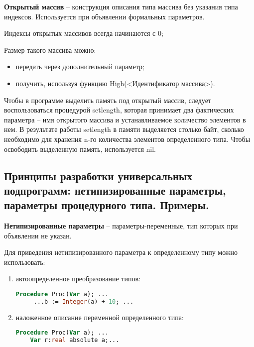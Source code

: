 {\bf Открытый массив} – конструкция описания типа массива без указания типа индексов. Используется при объявлении формальных параметров.

Индексы открытых массивов всегда начинаются с 0;

Размер такого массива можно:
\begin{itemize}
\item передать через дополнительный параметр;
\item получить, используя функцию High(<Идентификатор массива>).
\end{itemize}

Чтобы в программе выделить память под открытый массив, следует воспользоваться процедурой setlength, которая принимает два фактических параметра – имя открытого массива и устанавливаемое количество элементов в нем. В результате работы setlength в памяти выделяется столько байт, сколько необходимо для хранения n-го количества элементов определенного типа. Чтобы освободить выделенную память, используется nil.







\newpage\subsection{Принципы разработки универсальных подпрограмм:  нетипизированные параметры, параметры процедурного типа. Примеры. }


\begin{myquote}
            
\end{myquote}

{\bf Нетипизированные параметры} – параметры-переменные, тип которых при объявлении не указан.

Для приведения нетипизированного параметра к определенному типу можно использовать:

\begin{enumerate}
\item автоопределенное преобразование типов:
\begin{lstlisting}[language = pascal]
 	Procedure Proc(Var a); ...
  	 ...b := Integer(а) + 10; ...
\end{lstlisting}

\item наложенное описание переменной определенного типа:
\begin{lstlisting}[language = pascal]
 	Procedure Proc(Var a); ...
    Var r:real absolute a;...
\end{lstlisting}
\end{enumerate}

